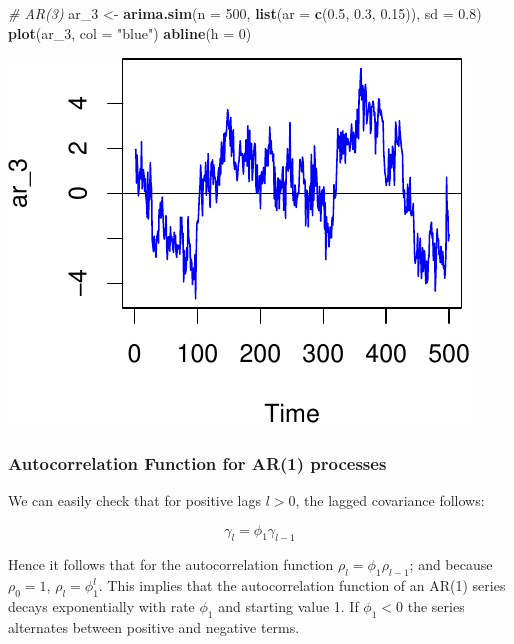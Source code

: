 \documentclass[11pt,]{article}
\newenvironment{Shaded}{\begin{snugshade}}{\end{snugshade}}
\newcommand{\KeywordTok}[1]{\textcolor[rgb]{0.13,0.29,0.53}{\textbf{#1}}}
\newcommand{\DataTypeTok}[1]{\textcolor[rgb]{0.13,0.29,0.53}{#1}}
\newcommand{\DecValTok}[1]{\textcolor[rgb]{0.00,0.00,0.81}{#1}}
\newcommand{\FloatTok}[1]{\textcolor[rgb]{0.00,0.00,0.81}{#1}}
\newcommand{\StringTok}[1]{\textcolor[rgb]{0.31,0.60,0.02}{#1}}
\newcommand{\CommentTok}[1]{\textcolor[rgb]{0.56,0.35,0.01}{\textit{#1}}}
\newcommand{\NormalTok}[1]{#1}
\begin{document}
\begin{Shaded}
\begin{Highlighting}[]
\CommentTok{# AR(3)}
\NormalTok{ar_}\DecValTok{3}\NormalTok{ <-}\StringTok{ }\KeywordTok{arima.sim}\NormalTok{(}\DataTypeTok{n =} \DecValTok{500}\NormalTok{, }\KeywordTok{list}\NormalTok{(}\DataTypeTok{ar =} \KeywordTok{c}\NormalTok{(}\FloatTok{0.5}\NormalTok{, }\FloatTok{0.3}\NormalTok{, }\FloatTok{0.15}\NormalTok{)), }\DataTypeTok{sd =} \FloatTok{0.8}\NormalTok{)}
\KeywordTok{plot}\NormalTok{(ar_}\DecValTok{3}\NormalTok{, }\DataTypeTok{col =} \StringTok{"blue"}\NormalTok{)}
\KeywordTok{abline}\NormalTok{(}\DataTypeTok{h =} \DecValTok{0}\NormalTok{)}
\end{Highlighting}
\end{Shaded}

\begin{center}\includegraphics{FMC_T4_PhD_ARMA_GARCH_files/figure-latex/arima_sim-4} \end{center}

\subsubsection{Autocorrelation Function for AR(1)
processes}\label{autocorrelation-function-for-ar1-processes}

We can easily check that for positive lags \(l>0\), the lagged
covariance follows:

\[\gamma_l = \phi_1\gamma_{l-1}\]

Hence it follows that for the autocorrelation function
\(\rho_l = \phi_1\rho_{l-1}\); and because \(\rho_0=1\),
\(\rho_l = \phi_1^l\). This implies that the autocorrelation function of
an AR(1) series decays exponentially with rate \(\phi_1\) and starting
value 1. If \(\phi_1<0\) the series alternates between positive and
negative terms.
\end{document}

